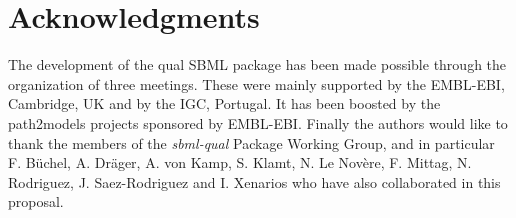 
\section{Acknowledgments}
	\label{sec:acknowledgements}
	\label{sec:acknowledgments}
	
	The development of the qual SBML package has been made possible through the organization of three meetings. These were mainly supported by the EMBL-EBI, Cambridge, UK and by the IGC, Portugal. It has been boosted by the path2models projects sponsored by EMBL-EBI. Finally the authors would like to thank the members of the \textit{sbml-qual} Package Working Group, and in particular F. B\"{u}chel, A. Dr\"{a}ger, A. von Kamp, S. Klamt, N. Le Nov\`ere, F. Mittag, N. Rodriguez, J. Saez-Rodriguez and I. Xenarios who have also collaborated in this proposal.
